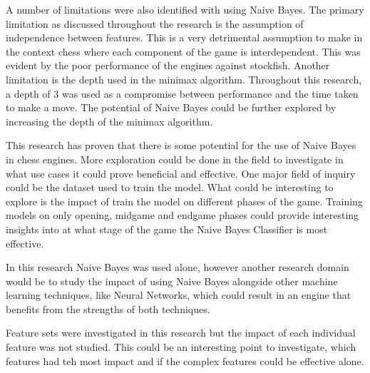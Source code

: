 A number of limitations were also identified with using Naive Bayes. The primary limitation as discussed throughout the research is the assumption of independence between features. This is a very detrimental assumption to make in the context chess where each component of the game is interdependent. This was evident by the poor performance of the engines against stockfish. Another limitation is the depth used in the minimax algorithm. Throughout this research, a depth of 3 was used as a compromise between performance and the time taken to make a move. The potential of Naive Bayes could be further explored by increasing the depth of the minimax algorithm.

This research has proven that there is some potential for the use of Naive Bayes in chess engines. More exploration could be done in the field to investigate in what use cases it could prove beneficial and effective. One major field of inquiry could be the dataset used to train the model. What could be interesting to explore is the impact of train the model on different phases of the game. Training models on only opening, midgame and endgame phases could provide interesting insights into at what stage of the game the Naive Bayes Classifier is most effective. 

In this research Naive Bayes was used alone, however another research domain would be to study the impact of using Naive Bayes alongside other machine learning techniques, like Neural Networks, which could result in an engine that benefits from the strengths of both techniques.

Feature sets were investigated in this research but the impact of each individual feature was not studied. This could be an interesting point to investigate, which features had teh most impact and if the complex features could be effective alone.







